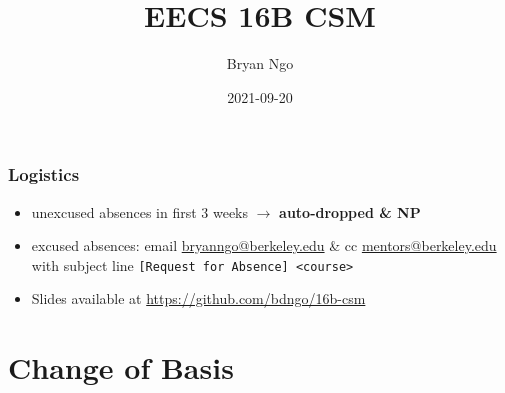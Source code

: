 \documentclass[aspectratio=169]{beamer}
\title{EECS 16B CSM}
\author{Bryan Ngo}
\date{2021-09-20}
\institute{Computer Science Mentors}
\begin{document}
\begin{frame}
    \maketitle
\end{frame}

\begin{frame}
    \tableofcontents
\end{frame}

\begin{frame}
    \frametitle{Logistics}

    \begin{itemize}
        \item unexcused absences in first 3 weeks \(\to\) \textbf{auto-dropped \& NP}
        \item excused absences: email \href{mailto:bryanngo@berkeley.edu}{bryanngo@berkeley.edu} \& cc \href{mailto:mentors@berkeley.edu}{mentors@berkeley.edu} with subject line \texttt{[Request for Absence] <course>}
        \item Slides available at \url{https://github.com/bdngo/16b-csm}
    \end{itemize}
\end{frame}

\section{Change of Basis}
\end{document}
